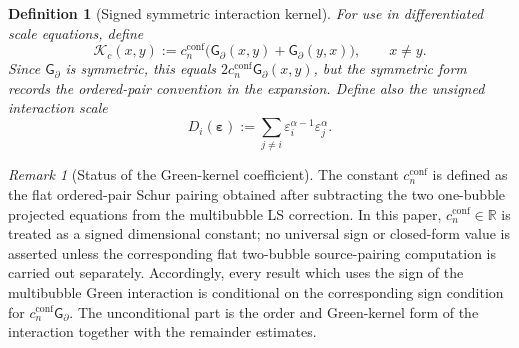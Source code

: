 \documentclass[11pt,reqno,a4paper]{amsart}
\numberwithin{equation}{section}
\theoremstyle{plain}
\newtheorem{definition}[theorem]{Definition}
\theoremstyle{remark}
\newtheorem{remark}[theorem]{Remark}
\theoremstyle{plain}
\begin{document}
\begin{definition}[Signed symmetric interaction kernel]\label{def:Kc-interaction}
For use in differentiated scale equations, define
\begin{equation}\label{eq:signed-symmetric-interaction-kernel}
\mathcal K_c(x,y)
:=
c_n^{\mathrm{conf}}
\bigl(
\mathsf G_\partial(x,y)+\mathsf G_\partial(y,x)
\bigr),
\qquad x\ne y.
\end{equation}
Since $\mathsf G_\partial$ is symmetric, this equals
$2c_n^{\mathrm{conf}}\mathsf G_\partial(x,y)$,
but the symmetric form records the ordered-pair convention in the expansion.
Define also the unsigned interaction scale
\[
D_i(\boldsymbol\varepsilon)
:=
\sum_{j\neq i}
\varepsilon_i^{\alpha-1}\varepsilon_j^{\alpha}.
\]
\end{definition}

\begin{remark}[Status of the Green-kernel coefficient]
\label{rem:green-coefficient-status}
The constant $c_n^{\mathrm{conf}}$ is defined as the flat ordered-pair Schur
pairing obtained after subtracting the two one-bubble projected equations from
the multibubble LS correction.  In this paper, $c_n^{\mathrm{conf}}\in\mathbb R$
is treated as a signed dimensional constant; no universal sign or closed-form
value is asserted unless the corresponding flat two-bubble source-pairing
computation is carried out separately.  Accordingly, every result which uses
the sign of the multibubble Green interaction is conditional on the
corresponding sign condition for $c_n^{\mathrm{conf}}\mathsf G_\partial$.
The unconditional part is the order and Green-kernel form of the interaction
together with the remainder estimates.
\end{remark}
\end{document}
